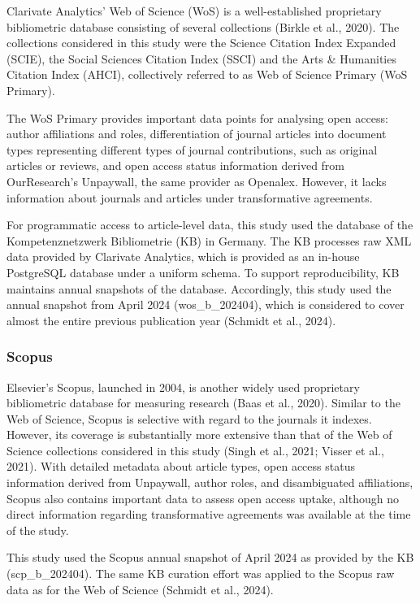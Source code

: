 \documentclass[a4paper,man,floatsintext,longtable,noextraspace,10pt]{apa6}
\begin{document}
Clarivate Analytics' Web of Science (WoS) is a well-established
proprietary bibliometric database consisting of several collections
(Birkle et al., 2020). The collections considered in this study were the
Science Citation Index Expanded (SCIE), the Social Sciences Citation
Index (SSCI) and the Arts \& Humanities Citation Index (AHCI),
collectively referred to as Web of Science Primary (WoS Primary).

The WoS Primary provides important data points for analysing open
access: author affiliations and roles, differentiation of journal
articles into document types representing different types of journal
contributions, such as original articles or reviews, and open access
status information derived from OurResearch's Unpaywall, the same
provider as Openalex. However, it lacks information about journals and
articles under transformative agreements.

For programmatic access to article-level data, this study used the
database of the Kompetenznetzwerk Bibliometrie (KB) in Germany. The KB
processes raw XML data provided by Clarivate Analytics, which is
provided as an in-house PostgreSQL database under a uniform schema. To
support reproducibility, KB maintains annual snapshots of the database.
Accordingly, this study used the annual snapshot from April 2024
(wos\_b\_202404), which is considered to cover almost the entire
previous publication year (Schmidt et al., 2024).

\subsubsection{Scopus}\label{scopus}

Elsevier's Scopus, launched in 2004, is another widely used proprietary
bibliometric database for measuring research (Baas et al., 2020).
Similar to the Web of Science, Scopus is selective with regard to the
journals it indexes. However, its coverage is substantially more
extensive than that of the Web of Science collections considered in this
study (Singh et al., 2021; Visser et al., 2021). With detailed metadata
about article types, open access status information derived from
Unpaywall, author roles, and disambiguated affiliations, Scopus also
contains important data to assess open access uptake, although no direct
information regarding transformative agreements was available at the
time of the study.

This study used the Scopus annual snapshot of April 2024 as provided by
the KB (scp\_b\_202404). The same KB curation effort was applied to the
Scopus raw data as for the Web of Science (Schmidt et al., 2024).
\end{document}
